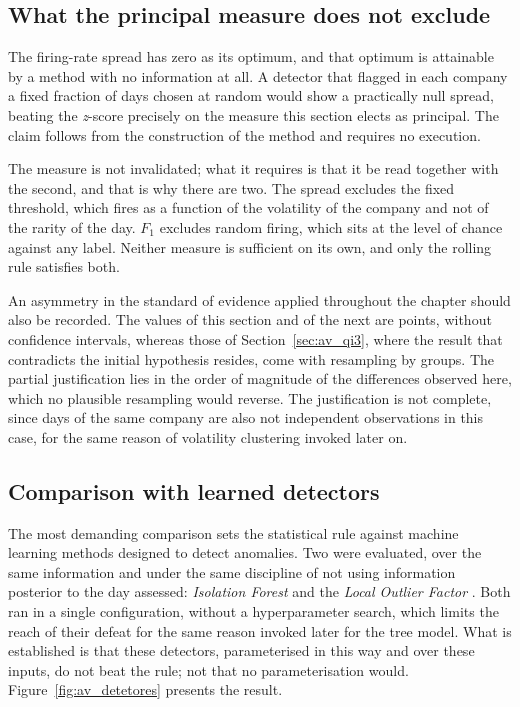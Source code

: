 \subsection{What the principal measure does not exclude}

The firing-rate spread has zero as its optimum, and that optimum is attainable by a method with no
information at all. A detector that flagged in each company a fixed fraction of days chosen at
random would show a practically null spread, beating the \emph{z}-score precisely on the measure
this section elects as principal. The claim follows from the construction of the method and
requires no execution.

The measure is not invalidated; what it requires is that it be read together with
the second, and that is why there are two. The spread excludes the fixed threshold, which fires as a
function of the volatility of the company and not of the rarity of the day. $F_1$ excludes random
firing, which sits at the level of chance against any label. Neither measure is sufficient on its
own, and only the rolling rule satisfies both.


An asymmetry in the standard of evidence applied throughout the chapter should also be recorded.
The values of this section and of the next are points, without confidence intervals, whereas those
of Section~\ref{sec:av_qi3}, where the result that contradicts the initial hypothesis resides, come
with resampling by groups. The partial justification lies in the order of magnitude of the
differences observed here, which no plausible resampling would reverse. The justification is not
complete, since days of the same company are also not independent observations in this case, for
the same reason of volatility clustering invoked later on.

\subsection{Comparison with learned detectors}

The most demanding comparison sets the statistical rule against machine learning methods designed
to detect anomalies. Two were evaluated, over the same information and under the same discipline of
not using information posterior to the day assessed: \emph{Isolation Forest}
\autocite{liu2008isolation} and the \emph{Local Outlier Factor} \autocite{breunig2000lof}. Both ran
in a single configuration, without a hyperparameter search, which limits the reach of their defeat
for the same reason invoked later for the tree model. What is established is that these detectors,
parameterised in this way and over these inputs, do not beat the rule; not that no parameterisation
would. Figure~\ref{fig:av_detetores} presents the result.

